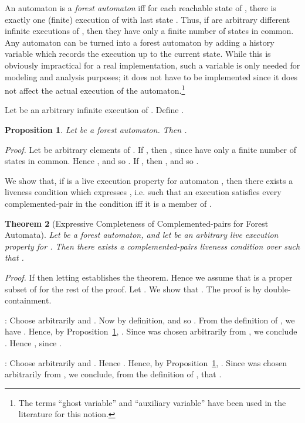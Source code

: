 \documentclass[11pt]{article}
\newcommand{\bp}{\begin{proposition}}
\newcommand{\ep}{\end{proposition}}
\newcommand{\bt}{\begin{theorem}}
\newcommand{\et}{\end{theorem}}
\newcommand{\bpr}{\begin{proof}}
\newcommand{\epr}{\end{proof}}
\newcommand{\intrdef}{\emph}	\newcommand{\intr}{\emph}
\newtheorem{theorem}{Theorem}
\newtheorem{proposition}[theorem]{Proposition}
\newenvironment{proof}{\vspace{-1.0ex}\textit{Proof.} }
                      {\hfill{}}
\begin{document}
An automaton  is a \intrdef{forest automaton} iff for each reachable state
 of , there is exactly one (finite) execution of  with last
state . 
Thus, if  are arbitrary different infinite executions of , then
they have only a finite number of states in common.
Any automaton can be turned into a forest automaton by
adding a history variable which records the execution up to the current
state. While this is obviously impractical for a real implementation,
such a variable is only needed for modeling and analysis purposes; it
does not have to be implemented since it does not affect the actual 
execution of the automaton.\footnote{The terms ``ghost variable'' and
``auxiliary variable'' have been used in the literature for this notion.}

Let  be an arbitrary infinite execution of .
Define .


\bp
\label{prop:exec-pair}
Let  be a forest automaton. Then
.
\ep
\bpr
Let  be arbitrary elements of .
If , then ,
since  have only a finite number of states in common.
Hence , and so .
If , then , and so 
      .
\epr


We show that, if  is a live execution
property for automaton , then there exists a liveness
condition which expresses , i.e. such that an execution
satisfies every complemented-pair in the condition iff it is a member
of .


\bt[Expressive Completeness of Complemented-pairs for Forest Automata]
\label{thm:execs-forest-completeness}
Let  be a forest automaton, and let  be an arbitrary
live execution property for .
Then there exists a complemented-pairs liveness condition
 over  such that .
\et
\bpr
If  then letting 
establishes the theorem. Hence we assume that
 is a proper subset of  for the rest of the proof.
Let .
We show that . The proof is by double-containment.

\noindent
{}:
Choose arbitrarily  and .
Now  by definition, and so .
From the definition of , we have .
Hence, by Proposition~\ref{prop:exec-pair}, .
Since  was chosen arbitrarily from 
, we conclude .
Hence  , since . 

\noindent
{}:
Choose arbitrarily  and .
Hence .
Hence, by Proposition~\ref{prop:exec-pair}, .
Since  was chosen arbitrarily from 
, we conclude, from the definition of , that 
.
\epr
\end{document}
